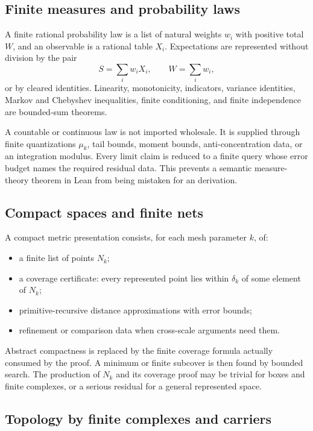 \subsection{Finite measures and probability laws}

A finite rational probability law is a list of natural weights \(w_i\) with positive total \(W\), and an observable is a rational table \(X_i\).  Expectations are represented without division by the pair
\[
  S=\sum_i w_iX_i,\qquad W=\sum_i w_i,
\]
or by cleared identities.  Linearity, monotonicity, indicators, variance identities, Markov and Chebyshev inequalities, finite conditioning, and finite independence are bounded-sum theorems.

A countable or continuous law is not imported wholesale.  It is supplied through finite quantizations \(\mu_k\), tail bounds, moment bounds, anti-concentration data, or an integration modulus.  Every limit claim is reduced to a finite query whose error budget names the required residual data.  This prevents a semantic measure-theory theorem in Lean from being mistaken for an \iPRA{} derivation.

\subsection{Compact spaces and finite nets}

A compact metric presentation consists, for each mesh parameter \(k\), of:
\begin{itemize}[leftmargin=2em]
\item a finite list of points \(N_k\);
\item a coverage certificate: every represented point lies within \(\delta_k\) of some element of \(N_k\);
\item primitive-recursive distance approximations with error bounds;
\item refinement or comparison data when cross-scale arguments need them.
\end{itemize}
Abstract compactness is replaced by the finite coverage formula actually consumed by the proof.  A minimum or finite subcover is then found by bounded search.  The production of \(N_k\) and its coverage proof may be trivial for boxes and finite complexes, or a serious residual for a general represented space.

\subsection{Topology by finite complexes and carriers}

